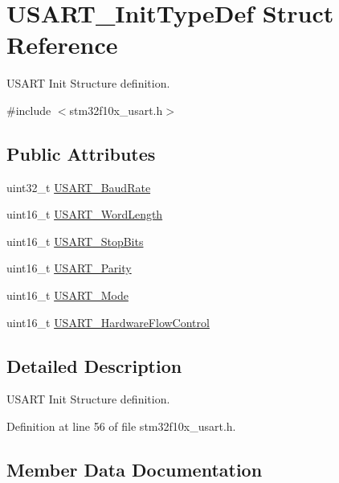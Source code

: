 \hypertarget{struct_u_s_a_r_t___init_type_def}{}\section{U\+S\+A\+R\+T\+\_\+\+Init\+Type\+Def Struct Reference}
\label{struct_u_s_a_r_t___init_type_def}


U\+S\+A\+RT Init Structure definition.  




{\ttfamily \#include $<$stm32f10x\+\_\+usart.\+h$>$}

\subsection*{Public Attributes}
\begin{DoxyCompactItemize}
\item 
uint32\+\_\+t \hyperlink{struct_u_s_a_r_t___init_type_def_a6f763cb0e6044f838ee764ce437997b2}{U\+S\+A\+R\+T\+\_\+\+Baud\+Rate}
\item 
uint16\+\_\+t \hyperlink{struct_u_s_a_r_t___init_type_def_a16d1fb7ccc2b51964f1bcfcbfba6d89d}{U\+S\+A\+R\+T\+\_\+\+Word\+Length}
\item 
uint16\+\_\+t \hyperlink{struct_u_s_a_r_t___init_type_def_ac745bceb79a6c4c2640fd8e8ce6639d6}{U\+S\+A\+R\+T\+\_\+\+Stop\+Bits}
\item 
uint16\+\_\+t \hyperlink{struct_u_s_a_r_t___init_type_def_a5ae66aba755bac37c5cf0dfbf529e2ed}{U\+S\+A\+R\+T\+\_\+\+Parity}
\item 
uint16\+\_\+t \hyperlink{struct_u_s_a_r_t___init_type_def_a7d944d35d7d1fc79a63f249615148584}{U\+S\+A\+R\+T\+\_\+\+Mode}
\item 
uint16\+\_\+t \hyperlink{struct_u_s_a_r_t___init_type_def_a9996edf3bfd90c36f03b4075969703f5}{U\+S\+A\+R\+T\+\_\+\+Hardware\+Flow\+Control}
\end{DoxyCompactItemize}


\subsection{Detailed Description}
U\+S\+A\+RT Init Structure definition. 

Definition at line 56 of file stm32f10x\+\_\+usart.\+h.



\subsection{Member Data Documentation}
\mbox{\label{struct_u_s_a_r_t___init_type_def_a6f763cb0e6044f838ee764ce437997b2}} 
